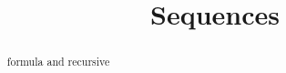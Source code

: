 \documentclass{ximera}
\title{Sequences}
\begin{document}
\begin{abstract}
formula and recursive
\end{abstract}
\maketitle
\end{document}
